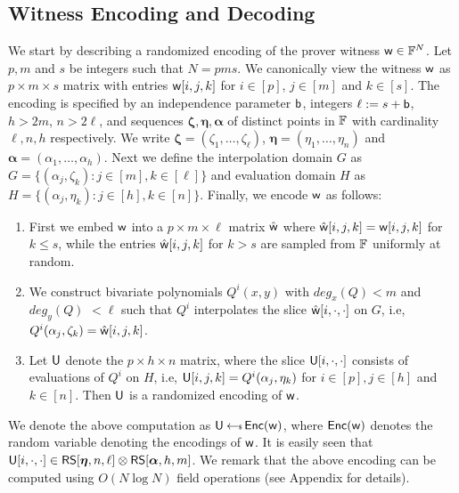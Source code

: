 \subsection{Witness Encoding and Decoding}\label{sec:witencoding}
We start by describing a randomized encoding of the prover witness $\mathsf{w}\in \mathbb{F}^N$. Let $p,m$ and
$s$ be integers such that $N=pms$. We canonically view the
witness $\mathsf{w}$ 
as $p\times m\times s$ matrix with entries $\mathsf{w}[i,j,k]$ for $i\in [p]$,
$j\in [m]$ and $k\in [s]$. The encoding is specified by an independence 
parameter $\mathsf{b}$, integers $\ell := s+\mathsf{b}$, $h>2m$, $n>2\ell$, and sequences
$\bm{\zeta},\bm{\eta},\bm{\alpha}$ of distinct points in $\mathbb{F}$ with cardinality 
$\ell,n,h$ respectively. We write $\bm{\zeta}=(\zeta_1,\ldots,\zeta_\ell)$,
$\bm{\eta}=(\eta_1,\ldots,\eta_n)$ and $\bm{\alpha}=(\alpha_1,\ldots,\alpha_h)$. 
Next we define the interpolation domain $G$ as $G=\{(\alpha_j,\zeta_k): j\in[m],
k\in [\ell]\}$ and evaluation domain $H$ as $H=\{(\alpha_j,\eta_k): j\in [h],
k\in [n]\}$. Finally, we encode $\mathsf{w}$ as follows:
\begin{enumerate}[{\rm (i)}]
\item First we embed $\mathsf{w}$ into a $p\times m\times \ell$ matrix $\hat{\mathsf{w}}$
where $\hat{\mathsf{w}}[i,j,k]=\mathsf{w}[i,j,k]$ for $k\leq s$, while the entries
$\hat{\mathsf{w}}[i,j,k]$ for $k>s$ are sampled from $\mathbb{F}$ uniformly at random.
\item We construct bivariate polynomials $Q^i(x,y)$ with $deg_x(Q)<m$ and
$deg_y(Q) $ $<\ell$ such that $Q^i$ interpolates the slice
$\hat{\mathsf{w}}[i,\cdot,\cdot]$ on $G$, i.e,
$Q^i(\alpha_j,\zeta_k)=\hat{\mathsf{w}}[i,j,k]$. 
\item Let $\mathsf{U}$ denote the $p\times h\times n$ matrix, where the slice
$\mathsf{U}[i,\cdot,\cdot]$ consists of evaluations of $Q^i$ on $H$, i.e,
$\mathsf{U}[i,j,k]=Q^i(\alpha_j,\eta_k)$ for $i\in [p], j\in [h]$ and $k\in [n]$.
Then $\mathsf{U}$ is a randomized encoding of $\mathsf{w}$.
\end{enumerate}
We denote the above computation as $\mathsf{U}\hskip2.3pt{\gets\!\!\mbox{\tiny${\$}$\normalsize}}\, \mathsf{Enc}(\mathsf{w})$, where $\mathsf{Enc}(\mathsf{w})$
denotes the random variable denoting the encodings of $\mathsf{w}$. It is easily seen
that $\mathsf{U}[i,\cdot,\cdot]\in \mathsf{RS}[\bm{\eta},n,\ell]\otimes \mathsf{RS}[\bm{\alpha},h,m]$. We remark that the above
encoding can be computed using $O(N\log N)$ field operations (see Appendix for
details).
